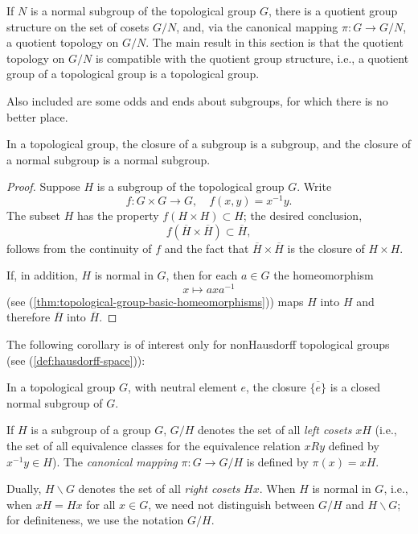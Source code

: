 If \( N \) is a normal subgroup of the topological group \( G \), there is a quotient group structure on the set of cosets \( G / N \), and, via the canonical mapping \( \pi : G \to G / N \), a quotient topology on \( G / N \). The main result in this section is that the quotient topology on \( G / N \) is compatible with the quotient group structure, i.e., a quotient group of a topological group is a topological group.

Also included are some odds and ends about subgroups, for which there is no better place.


\begin{theorem}
    In a topological group, the closure of a subgroup is a subgroup, and the closure of a normal subgroup is a normal subgroup.
\end{theorem}

\begin{proof}
    Suppose \( H \) is a subgroup of the topological group \( G \). Write
    \[
        f : G \times G \to G, \quad f(x, y) = x^{-1}y.
    \]
    The subset \( H \) has the property \( f(H \times H) \subset H \); the desired conclusion,
    \[
        f(\overline{H} \times \overline{H}) \subset \overline{H},
    \]
    follows from the continuity of \( f \) and the fact that \( \overline{H} \times \overline{H} \) is the closure of \( H \times H \).

    If, in addition, \( H \) is normal in \( G \), then for each \( a \in G \) the homeomorphism
    \[
        x \mapsto axa^{-1}
    \]
    (see (\ref{thm:topological-group-basic-homeomorphisms})) maps \( H \) into \( H \) and therefore \( \overline{H} \) into \( \overline{H} \).
\end{proof}


The following corollary is of interest only for nonHausdorff topological groups (see (\ref{def:hausdorff-space})):


\begin{corollary}
    In a topological group \( G \), with neutral element \( e \), the closure \( \overline{\{e\}} \) is a closed normal subgroup of \( G \).
\end{corollary}

\begin{definition}
    If \( H \) is a subgroup of a group \( G \), \( G / H \) denotes the set of all \emph{left cosets} \( xH \) (i.e., the set of all equivalence classes for the equivalence relation \( x R y \) defined by \( x^{-1} y \in H \)). The \emph{canonical mapping} \( \pi : G \to G/H \) is defined by \( \pi(x) = xH \).

    Dually, \( H \backslash G \) denotes the set of all \emph{right cosets} \( Hx \). When \( H \) is normal in \( G \), i.e., when \( xH = Hx \) for all \( x \in G \), we need not distinguish between \( G/H \) and \( H \backslash G \); for definiteness, we use the notation \( G/H \).
\end{definition}


